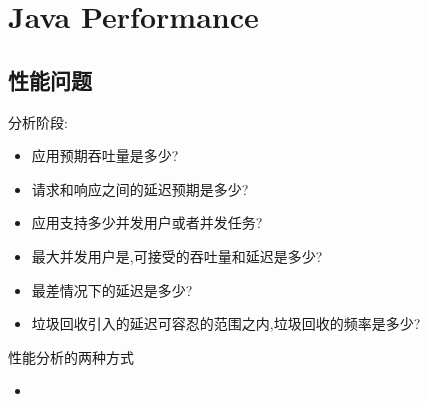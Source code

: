 \chapter{Java Performance}

\section{性能问题}


分析阶段:
\begin{itemize}
\item 应用预期吞吐量是多少?
\item 请求和响应之间的延迟预期是多少?
\item 应用支持多少并发用户或者并发任务?
\item 最大并发用户是,可接受的吞吐量和延迟是多少?
\item 最差情况下的延迟是多少?
\item 垃圾回收引入的延迟可容忍的范围之内,垃圾回收的频率是多少?
\end{itemize}


性能分析的两种方式
\begin{itemize}
\item 
\end{itemize}

